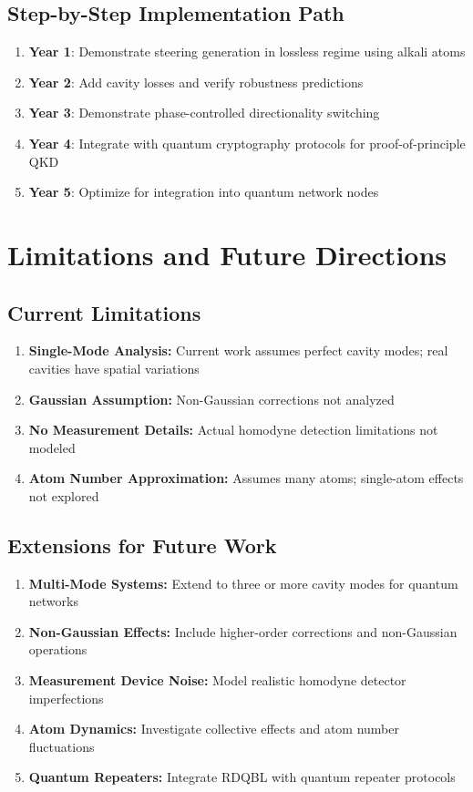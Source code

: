 \subsection{Step-by-Step Implementation Path}

\begin{enumerate}
	\item \textbf{Year 1}: Demonstrate steering generation in lossless regime using alkali atoms
	\item \textbf{Year 2}: Add cavity losses and verify robustness predictions
	\item \textbf{Year 3}: Demonstrate phase-controlled directionality switching
	\item \textbf{Year 4}: Integrate with quantum cryptography protocols for proof-of-principle QKD
	\item \textbf{Year 5}: Optimize for integration into quantum network nodes
\end{enumerate}

\section{Limitations and Future Directions}

\subsection{Current Limitations}

\begin{enumerate}
	\item \textbf{Single-Mode Analysis:} Current work assumes perfect cavity modes; real cavities have spatial variations
	\item \textbf{Gaussian Assumption:} Non-Gaussian corrections not analyzed
	\item \textbf{No Measurement Details:} Actual homodyne detection limitations not modeled
	\item \textbf{Atom Number Approximation:} Assumes many atoms; single-atom effects not explored
\end{enumerate}

\subsection{Extensions for Future Work}

\begin{enumerate}
	\item \textbf{Multi-Mode Systems:} Extend to three or more cavity modes for quantum networks
	\item \textbf{Non-Gaussian Effects:} Include higher-order corrections and non-Gaussian operations
	\item \textbf{Measurement Device Noise:} Model realistic homodyne detector imperfections
	\item \textbf{Atom Dynamics:} Investigate collective effects and atom number fluctuations
	\item \textbf{Quantum Repeaters:} Integrate RDQBL with quantum repeater protocols
\end{enumerate}


